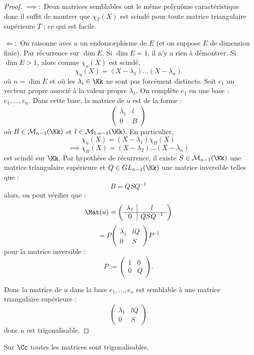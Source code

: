 \documentclass[class=report,crop=false]{standalone}
\newcommand{\GL}{GL}
\begin{document}
\begin{proof}
{$\mathbf \implies :$} Deux matrices semblables ont le même polynôme caractéristique donc il suffit de montrer que $\chi_T(X)$ est scindé pour toute matrice triangulaire supérieure $T$ ; ce qui est facile.

{$\mathbf \Leftarrow :$} On raisonne aves $u$ un endomorphisme de $E$ (et on suppose $E$ de dimension finie). Par récurrence sur $\dim E$. Si $\dim E = 1$, il n'y a rien à démontrer. Si $\dim E > 1$, alors comme $\chi_u(X)$ est scindé, 
\[\chi_u(X) = (X-\lambda_1)...(X-\lambda_n)\]
où $n = \dim E$ et où les $\lambda_i \in \Kk$ ne sont pas forcément distincts. Soit $e_1$ un vecteur propre associé à la valeur propre $\lambda_1$. On complète $e_1$ en une base :
$e_1,...,e_n$. Dans cette base, la matrice de $u$ est de la forme :
\[\left(\begin{array}{c|c}
\lambda_1 & l\\\hline
0 & B
\end{array}\right) \]
où $B \in \mathcal{M}_{n-1}(\Kk)$ et $l \in \mathcal{M}_{1,n-1}(\Kk)$. En particulier, \[\chi_u(X) = (X-\lambda_1)\chi_B(X)\]
\[\implies \chi_B(X) = (X-\lambda_2)...(X-\lambda_n)\] est scindé sur $\Kk$. Par hypothèse de récurrence, il existe $S \in \mathcal{M}_{n-1}(\Kk)$ une matrice triangulaire supérieure et $Q \in \GL_{n-1}(\Kk)$ une matrice inversible telles que :
\[B = Q S Q^{-1}\]
alors, on peut vérifier que : 
\[\Mat(u) = \left(\begin{array}{c|c}
\lambda_1 & l\\\hline
0 & QSQ^{-1}
\end{array}\right) \]
\[= P \left(\begin{array}{c|c}
\lambda_1 & lQ\\\hline
0 & S
\end{array}\right) P^{-1}\]pour la matrice inversible :
\[P := \left(\begin{array}{c|c}
1 & 0\\\hline
0 & Q
\end{array}\right) .\]

Donc la matrice de $u$ dans la base $e_1,...,e_n$ est semblable à une matrice triangulaire supérieure :
\[\left(\begin{array}{c|c}
\lambda_1 & lQ\\\hline
0 & S
\end{array}\right) \]
donc $u$ est trigonalisable. 
\end{proof}

\begin{corollaire}
Sur $\Cc$ toutes les matrices sont trigonalisables.
\end{corollaire}
\end{document}
